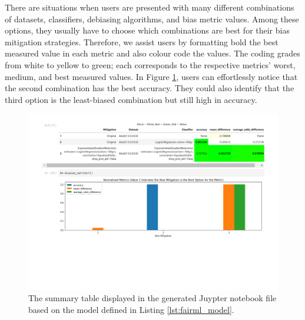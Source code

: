 \documentclass[sigconf]{acmart}
\begin{document}
{	There are situations when users are presented with many different combinations of datasets, classifiers, debiasing algorithms, and bias metric values. Among these options, they usually have to choose which combinations are best for their bias mitigation strategies. Therefore, we assist users by formatting bold the best measured value in each metric and also colour code the values. The coding grades from white to yellow to green; each corresponds to the respective metrics' worst, medium, and best measured values. In Figure \ref{fig:table-output}, users can effortlessly notice that the second combination has the best accuracy. They could also identify that the third option is the least-biased combination but still high in accuracy.
		
	\begin{figure}
		\includegraphics[width=\linewidth]{figures/table-output}
		\caption{The summary table displayed in the generated Juypter notebook file based on the model defined in Listing \ref{lst:fairml_model}.}
		\label{fig:table-output}
	\end{figure}
	
}
\end{document}
